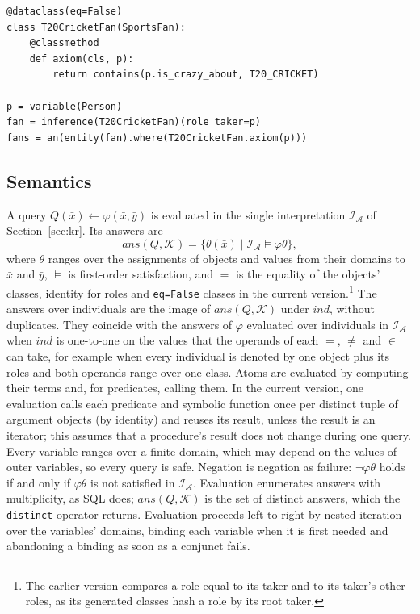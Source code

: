 \documentclass[sigconf,anonymous]{aamas}
\begin{document}
\begin{lstlisting}[style=eql, caption={An OWL class definition as an axiom, used as the body of a classification rule.}, label={lst:axiom}]
@dataclass(eq=False)
class T20CricketFan(SportsFan):
    @classmethod
    def axiom(cls, p):
        return contains(p.is_crazy_about, T20_CRICKET)

p = variable(Person)
fan = inference(T20CricketFan)(role_taker=p)
fans = an(entity(fan).where(T20CricketFan.axiom(p)))
\end{lstlisting}

\subsection{Semantics}
\label{ssec:eql_semantics}

A query $Q(\bar x)\leftarrow\varphi(\bar x,\bar y)$ is evaluated in the single interpretation $\mathcal{I}_{\mathcal{A}}$ of Section~\ref{sec:kr}. Its answers are
\[
\mathit{ans}(Q,\mathcal{K}) = \{\theta(\bar x) \mid \mathcal{I}_{\mathcal{A}}\models \varphi\theta\},
\]
where $\theta$ ranges over the assignments of objects and values from their domains to $\bar x$ and $\bar y$, $\models$ is first-order satisfaction, and $=$ is the equality of the objects' classes, identity for roles and \texttt{eq=False} classes in the current version.\footnote{The earlier version compares a role equal to its taker and to its taker's other roles, as its generated classes hash a role by its root taker.} The answers over individuals are the image of $\mathit{ans}(Q,\mathcal{K})$ under $\mathit{ind}$, without duplicates. They coincide with the answers of $\varphi$ evaluated over individuals in $\mathcal{I}_{\mathcal{A}}$ when $\mathit{ind}$ is one-to-one on the values that the operands of each $=$, $\neq$ and $\in$ can take, for example when every individual is denoted by one object plus its roles and both operands range over one class. Atoms are evaluated by computing their terms and, for predicates, calling them. In the current version, one evaluation calls each predicate and symbolic function once per distinct tuple of argument objects (by identity) and reuses its result, unless the result is an iterator; this assumes that a procedure's result does not change during one query. Every variable ranges over a finite domain, which may depend on the values of outer variables, so every query is safe. Negation is negation as failure: $\neg\varphi\theta$ holds if and only if $\varphi\theta$ is not satisfied in $\mathcal{I}_{\mathcal{A}}$. Evaluation enumerates answers with multiplicity, as SQL does; $\mathit{ans}(Q,\mathcal{K})$ is the set of distinct answers, which the \texttt{distinct} operator returns. Evaluation proceeds left to right by nested iteration over the variables' domains, binding each variable when it is first needed and abandoning a binding as soon as a conjunct fails.
\end{document}
